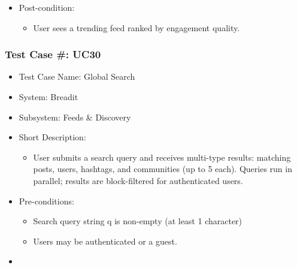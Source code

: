 \begin{itemize}
  \item Post-condition:
\begin{itemize}
  \item User sees a trending feed ranked by engagement quality.
\end{itemize}
\end{itemize}

\subsubsection{Test Case \#: UC30}
\begin{itemize}
  \item Test Case Name: Global Search
  \item System: Breadit
  \item Subsystem: Feeds \& Discovery
  \item Short Description:
\begin{itemize}
  \item User submits a search query and receives multi-type results: matching posts, users, hashtags, and communities (up to 5 each). Queries run in parallel; results are block-filtered for authenticated users.
\end{itemize}
  \item Pre-conditions:
\begin{itemize}
  \item Search query string q is non-empty (at least 1 character)
  \item Users may be authenticated or a guest.
\end{itemize}
  \item 
\end{itemize}

